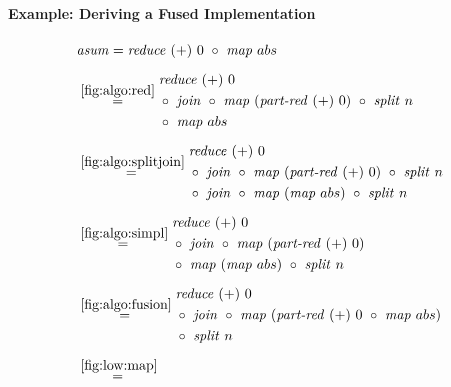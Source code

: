 \paragraph{Example: Deriving a Fused Implementation}

\begin{figure*}[t]
\begin{align*}
  &\text{\textit{asum}} = \reduce\ (+)\ 0\ \circ\ \map\ abs\\[.5em]
  &\begin{aligned}
  & \overset{\ref{fig:algo:red}}{\hspace{.2em}=\hspace{.2em}}
      \begin{aligned}
        & \reduce\ (+)\ 0\\
        &\circ\ \join\ \circ\ \map\ (\partRed\ (+)\ 0)\ \circ\ \splitN\ n\\
        &\circ\ \map\ abs
      \end{aligned}\\[.5em]
  & \overset{\ref{fig:algo:splitjoin}}{=\hspace{.2em}}
      \begin{aligned}
        & \reduce\ (+)\ 0\\
        &\circ\ \join\ \circ\ \map\ (\partRed\ (+)\ 0)\ \circ\ \splitN\ n\\
        &\circ\ \join\ \circ\ \map\ (\map\ abs)\ \circ\ \splitN\ n
      \end{aligned}\\[.5em]
  & \overset{\ref{fig:algo:simpl}}{=\hspace{.2em}}
      \begin{aligned}
        & \reduce\ (+)\ 0\\
        &\circ\ \join\ \circ\ \map\ (\partRed\ (+)\ 0)\\
        &\circ\ \map\ (\map\ abs)\ \circ\ \splitN\ n
      \end{aligned}\\[.5em]
  & \overset{\ref{fig:algo:fusion}}{=\hspace{.2em}}
      \begin{aligned}
        & \reduce\ (+)\ 0\\
        &\circ\ \join\ \circ\ \map\ (\partRed\ (+)\ 0\ \circ\ \map\ abs)\\
        &\circ\ \splitN\ n
      \end{aligned}\\[.5em]
  & \overset{\ref{fig:low:map}}{=\hspace{.2em}}

\end{aligned}
\end{align*}
\end{figure*}
